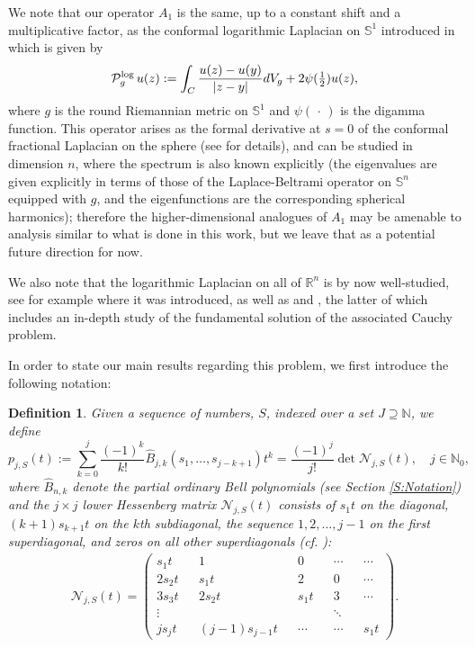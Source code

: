 \documentclass[letterpaper,10pt]{amsart}
\newtheorem{definition}[thm]{Definition}
\newcommand{\R}{\mathbb R}
\numberwithin{equation}{section}
\begin{document}
We note that our operator $A_1$ is the same, up to a constant shift and a multiplicative factor, as the conformal logarithmic Laplacian on $\mathbb{S}^1$ introduced in \cite{FeS25} which is given by
\begin{align} \mathcal{P}_g^{\textnormal{log}} \, u(z):=\int_{C}  \frac{u(z)-u(y)}{|z-y|}dV_g + 2\psi(\tfrac{1}{2})u(z),
\end{align}
where $g$ is the round Riemannian metric on $\mathbb{S}^1$ and $\psi(\,\cdot\,)$ is the digamma function. This operator arises as the formal derivative at $s =0$ of the conformal fractional Laplacian on the sphere (see \cite{FeS25} for details), and can be studied in dimension $n$, where the spectrum is also known explicitly (the eigenvalues are given explicitly in terms of those of the Laplace-Beltrami operator on $\mathbb{S}^n$ equipped with $g$, and the eigenfunctions are the corresponding spherical harmonics); therefore the higher-dimensional analogues of $A_1$ may be amenable to analysis similar to what is done in this work, but we leave that as a potential future direction for now. 

We also note that the logarithmic Laplacian on all of $\R^n$ is by now well-studied, see for example \cite{CW19} where it was introduced, as well as \cite{LW21} and \cite{CV24}, the latter of which includes an in-depth study of the fundamental solution of the associated Cauchy problem.

In order to state our main results regarding this problem, we first introduce the following notation:

\begin{definition}\label{Def:pj}
Given a sequence of numbers, $S$, indexed over a set $J\supseteq \mathbb{N}$, we define
\begin{equation}\label{Eq:12a}
p_{j,S}(t):=\sum_{k=0}^j \frac{(-1)^k}{k!} \widehat{B}_{j,k}(s_1,\dots,s_{j-k+1})t^k=\frac{(-1)^j}{j!}\det\mathcal{N}_{j,S}(t),\quad j\in\mathbb{N}_0,
\end{equation}
where $\widehat{B}_{n,k}$ denote the \textup{partial ordinary Bell polynomials} (see Section \ref{S:Notation}) and the $j\times j$ lower Hessenberg matrix $\mathcal{N}_{j,S}(t)$ consists of $s_1 t$ on the diagonal, $(k+1)s_{k+1} t$ on the $k$th subdiagonal, the sequence $1,2,\dots, j-1$ on the first superdiagonal, and zeros on all other superdiagonals (cf. \cite[Eq. (5.3)]{OS22}):
\begin{align}\label{Eq:matrix}
    \mathcal{N}_{j,S}(t) = \begin{pmatrix}
        s_1 t && 1 && 0  && \cdots &&\cdots\\ 2s_2t && s_1t&&2&&0 &&\cdots \\ 
        3s_3t && 2s_2t&& s_1 t&& 3 &&\cdots \\ \vdots && &&  && \ddots \\ js_jt && (j-1)s_{j-1}t && \cdots &&  \cdots && s_1 t
    \end{pmatrix}.
\end{align}
\end{definition}
\end{document}
